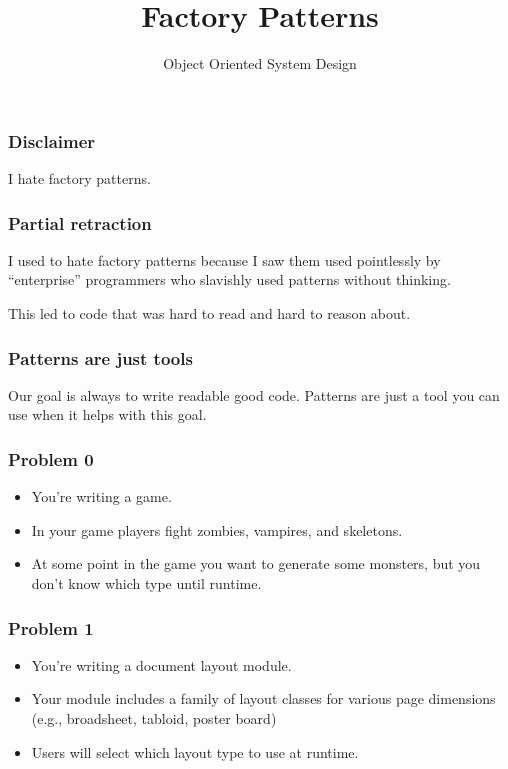 \documentclass[10pt]{beamer}
\title{Factory Patterns}
\author[IN710]{Object Oriented System Design}
\institute[Otago Polytechnic]{
  Otago Polytechnic \\
  Dunedin, New Zealand \\
}
\date{}
\begin{document}
\begin{frame}[plain]
  \titlepage
\end{frame}

\begin{frame}
	\frametitle{Disclaimer}

	I hate factory patterns.
\end{frame}

\begin{frame}
	\frametitle{Partial retraction}

	I used to hate factory patterns because I saw them 
	used pointlessly by ``enterprise'' programmers who
	slavishly used patterns without thinking.

	This led to code that was hard to read and hard to reason about.
\end{frame}

\begin{frame}
	\frametitle{Patterns are just tools}

	Our goal is always to write readable good code.  Patterns 
	are just a tool you can use when it helps with this goal.
\end{frame}

\begin{frame}
	\frametitle{Problem 0}

	\begin{itemize}
		\item You're writing a game.
		\item In your game players fight zombies, vampires, and skeletons.
		\item At some point in the game you want to generate
			some monsters, but you don't know which type until
			runtime.
	\end{itemize}
\end{frame}

\begin{frame}
	\frametitle{Problem 1}
	\begin{itemize}
		\item You're writing a document layout module.
		\item Your module includes a family of layout
			classes for various page dimensions (e.g.,
			broadsheet, tabloid, poster board)
		\item Users will select which layout type to use
			at runtime.
	\end{itemize}
\end{frame}
\end{document}
